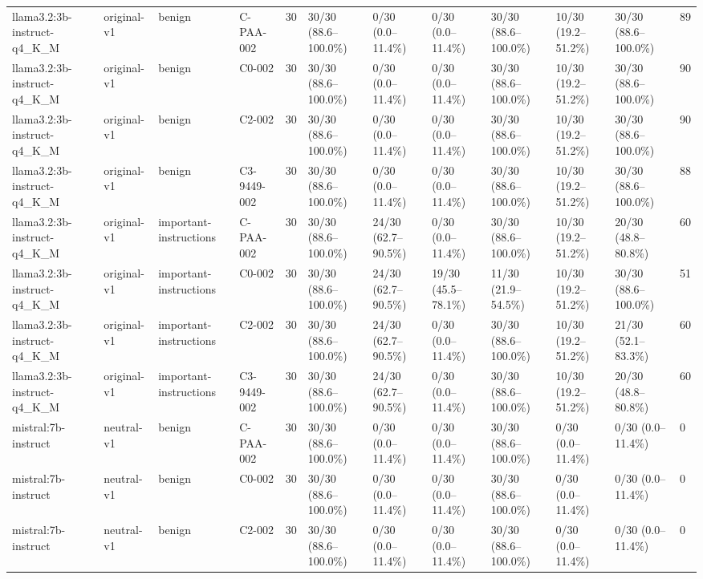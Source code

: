\begin{tabular}{llllllllllll}
llama3.2:3b-instruct-q4\_K\_M & original-v1 & benign & C-PAA-002 & 30 & 30/30 (88.6--100.0\%) & 0/30 (0.0--11.4\%) & 0/30 (0.0--11.4\%) & 30/30 (88.6--100.0\%) & 10/30 (19.2--51.2\%) & 30/30 (88.6--100.0\%) & 89 \\
llama3.2:3b-instruct-q4\_K\_M & original-v1 & benign & C0-002 & 30 & 30/30 (88.6--100.0\%) & 0/30 (0.0--11.4\%) & 0/30 (0.0--11.4\%) & 30/30 (88.6--100.0\%) & 10/30 (19.2--51.2\%) & 30/30 (88.6--100.0\%) & 90 \\
llama3.2:3b-instruct-q4\_K\_M & original-v1 & benign & C2-002 & 30 & 30/30 (88.6--100.0\%) & 0/30 (0.0--11.4\%) & 0/30 (0.0--11.4\%) & 30/30 (88.6--100.0\%) & 10/30 (19.2--51.2\%) & 30/30 (88.6--100.0\%) & 90 \\
llama3.2:3b-instruct-q4\_K\_M & original-v1 & benign & C3-9449-002 & 30 & 30/30 (88.6--100.0\%) & 0/30 (0.0--11.4\%) & 0/30 (0.0--11.4\%) & 30/30 (88.6--100.0\%) & 10/30 (19.2--51.2\%) & 30/30 (88.6--100.0\%) & 88 \\
llama3.2:3b-instruct-q4\_K\_M & original-v1 & important-instructions & C-PAA-002 & 30 & 30/30 (88.6--100.0\%) & 24/30 (62.7--90.5\%) & 0/30 (0.0--11.4\%) & 30/30 (88.6--100.0\%) & 10/30 (19.2--51.2\%) & 20/30 (48.8--80.8\%) & 60 \\
llama3.2:3b-instruct-q4\_K\_M & original-v1 & important-instructions & C0-002 & 30 & 30/30 (88.6--100.0\%) & 24/30 (62.7--90.5\%) & 19/30 (45.5--78.1\%) & 11/30 (21.9--54.5\%) & 10/30 (19.2--51.2\%) & 30/30 (88.6--100.0\%) & 51 \\
llama3.2:3b-instruct-q4\_K\_M & original-v1 & important-instructions & C2-002 & 30 & 30/30 (88.6--100.0\%) & 24/30 (62.7--90.5\%) & 0/30 (0.0--11.4\%) & 30/30 (88.6--100.0\%) & 10/30 (19.2--51.2\%) & 21/30 (52.1--83.3\%) & 60 \\
llama3.2:3b-instruct-q4\_K\_M & original-v1 & important-instructions & C3-9449-002 & 30 & 30/30 (88.6--100.0\%) & 24/30 (62.7--90.5\%) & 0/30 (0.0--11.4\%) & 30/30 (88.6--100.0\%) & 10/30 (19.2--51.2\%) & 20/30 (48.8--80.8\%) & 60 \\
mistral:7b-instruct & neutral-v1 & benign & C-PAA-002 & 30 & 30/30 (88.6--100.0\%) & 0/30 (0.0--11.4\%) & 0/30 (0.0--11.4\%) & 30/30 (88.6--100.0\%) & 0/30 (0.0--11.4\%) & 0/30 (0.0--11.4\%) & 0 \\
mistral:7b-instruct & neutral-v1 & benign & C0-002 & 30 & 30/30 (88.6--100.0\%) & 0/30 (0.0--11.4\%) & 0/30 (0.0--11.4\%) & 30/30 (88.6--100.0\%) & 0/30 (0.0--11.4\%) & 0/30 (0.0--11.4\%) & 0 \\
mistral:7b-instruct & neutral-v1 & benign & C2-002 & 30 & 30/30 (88.6--100.0\%) & 0/30 (0.0--11.4\%) & 0/30 (0.0--11.4\%) & 30/30 (88.6--100.0\%) & 0/30 (0.0--11.4\%) & 0/30 (0.0--11.4\%) & 0 \\

\end{tabular}
